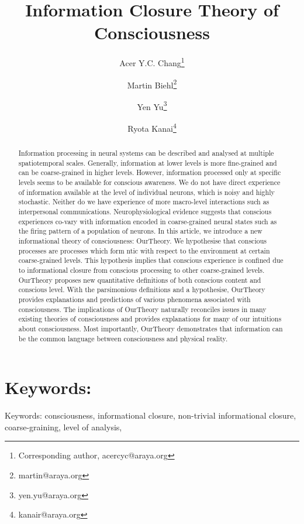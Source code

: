\documentclass[utf8]{article}
\title{Information Closure Theory of Consciousness}
\date{}
\author[]{Acer Y.C. Chang\thanks{Corresponding author, acercyc@araya.org}}
\author[]{Martin Biehl\thanks{martin@araya.org}}
\author[]{Yen Yu\thanks{yen.yu@araya.org}}
\author[]{Ryota Kanai\thanks{kanair@araya.org }}
\affil[]{ARAYA, Inc., Tokyo, Japan}
\begin{document}
    \linenumbers
	\maketitle
	\tableofcontents


	\begin{abstract}
		Information processing in neural systems can be described and analysed at multiple spatiotemporal scales. Generally, information at lower levels is more fine-grained and can be coarse-grained in higher levels. However, information processed only at specific levels seems to be available for conscious awareness. We do not have direct experience of information available at the level of individual neurons, which is noisy and highly stochastic. Neither do we have experience of more macro-level interactions such as interpersonal communications. Neurophysiological evidence suggests that conscious experiences co-vary with information encoded in coarse-grained neural states such as the firing pattern of a population of neurons. In this article, we introduce a new informational theory of consciousness: \acf{OurTheory}. We hypothesise that conscious processes are processes which form \ac{ntic} with respect to the environment at certain coarse-grained levels. This hypothesis implies that conscious experience is confined due to informational closure from conscious processing to other coarse-grained levels. \ac{OurTheory} proposes new quantitative definitions of both conscious content and conscious level. With the parsimonious definitions and a hypothesise, \ac{OurTheory} provides explanations and predictions of various phenomena associated with consciousness. The implications of \ac{OurTheory} naturally reconciles issues in many existing theories of consciousness and provides explanations for many of our intuitions about consciousness. Most importantly, \ac{OurTheory} demonstrates that information can be the common language between consciousness and physical reality.

		
	\end{abstract}


	\section*{Keywords:}
	Keywords: consciousness, informational closure, non-trivial informational closure, coarse-graining, level of analysis,

\end{document}
